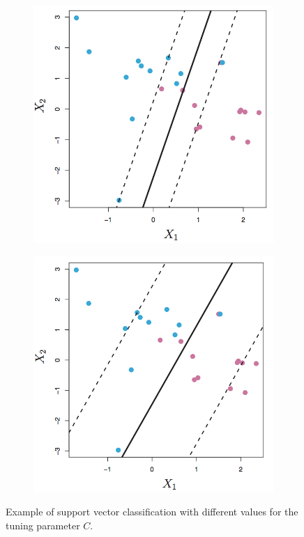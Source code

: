 \documentclass[CS5104-Notes.tex]{subfiles}
\begin{document}
\begin{figure}[H]
\centering
\begin{subfigure}{0.4\textwidth}
  \centering
  \includegraphics[width=1\textwidth, keepaspectratio]{imgs/support-vector-classification1.png}
\end{subfigure}
\begin{subfigure}{0.4\textwidth}
  \centering
  \includegraphics[width=1\textwidth, keepaspectratio]{imgs/support-vector-classification2.png}
\end{subfigure}
\caption{Example of support vector classification with different values for the tuning parameter $C$.}
\end{figure}
\end{document}
